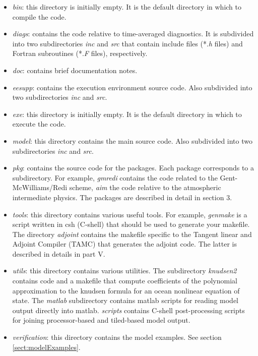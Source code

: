 \begin{itemize}
\item \textit{bin}: this directory is initially empty. It is the default
directory in which to compile the code.

\item \textit{diags}: contains the code relative to time-averaged
diagnostics. It is subdivided into two subdirectories \textit{inc} and 
\textit{src} that contain include files (*.\textit{h} files) and Fortran
subroutines (*.\textit{F} files), respectively.

\item \textit{doc}: contains brief documentation notes.

\item \textit{eesupp}: contains the execution environment source code. Also
subdivided into two subdirectories \textit{inc} and \textit{src}.

\item \textit{exe}: this directory is initially empty. It is the default
directory in which to execute the code.

\item \textit{model}: this directory contains the main source code. Also
subdivided into two subdirectories \textit{inc} and \textit{src}.

\item \textit{pkg}: contains the source code for the packages. Each package
corresponds to a subdirectory. For example, \textit{gmredi} contains the
code related to the Gent-McWilliams/Redi scheme, \textit{aim} the code
relative to the atmospheric intermediate physics. The packages are described
in detail in section 3.

\item \textit{tools}: this directory contains various useful tools. For
example, \textit{genmake} is a script written in csh (C-shell) that should
be used to generate your makefile. The directory \textit{adjoint} contains
the makefile specific to the Tangent linear and Adjoint Compiler (TAMC) that
generates the adjoint code. The latter is described in details in part V.

\item \textit{utils}: this directory contains various utilities. The
subdirectory \textit{knudsen2} contains code and a makefile that
compute coefficients of the polynomial approximation to the knudsen
formula for an ocean nonlinear equation of state. The \textit{matlab}
subdirectory contains matlab scripts for reading model output directly
into matlab. \textit{scripts} contains C-shell post-processing
scripts for joining processor-based and tiled-based model output.

\item \textit{verification}: this directory contains the model examples. See
section \ref{sect:modelExamples}.
\end{itemize}

